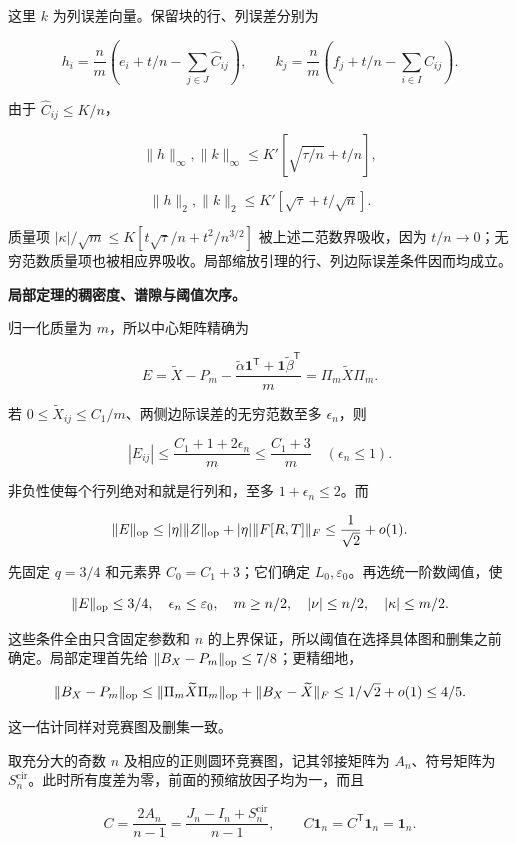 \documentclass[11pt,a4paper]{article}
\begin{document}
这里 \(k\) 为列误差向量。保留块的行、列误差分别为

\[
h_i=\frac nm\left(e_i+t/n-\sum_{j\in J}\widehat C_{ij}\right),\qquad
k_j=\frac nm\left(f_j+t/n-\sum_{i\in I}\widehat C_{ij}\right).
\]

由于 \(\widehat C_{ij}\le K/n\)，

\[
\|h\|_\infty,\|k\|_\infty\le K'[\sqrt{\tau/n}+t/n],
\]

\[
\|h\|_2,\|k\|_2\le K'[\sqrt\tau+t/\sqrt n].
\]

质量项 \(|\kappa|/\sqrt m\le K[t\sqrt\tau/n+t^2/n^{3/2}]\) 被上述二范数界吸收，因为 \(t/n\to0\)；无穷范数质量项也被相应界吸收。局部缩放引理的行、列边际误差条件因而均成立。

\textbf{局部定理的稠密度、谱隙与阈值次序。}

归一化质量为 \(m\)，所以中心矩阵精确为

\[
E=\widetilde X-P_m-\frac{\widetilde\alpha\mathbf1^{\mathsf T}
+\mathbf1\widetilde\beta^{\mathsf T}}m
=\Pi_m\widetilde X\Pi_m.
\]

若 \(0\le\widetilde X_{ij}\le C_1/m\)、两侧边际误差的无穷范数至多 \(\epsilon_n\)，则

\[
|E_{ij}|\le\frac{C_1+1+2\epsilon_n}{m}\le\frac{C_1+3}{m}
\quad(\epsilon_n\le1).
\]

非负性使每个行列绝对和就是行列和，至多 \(1+\epsilon_n\le2\)。而

\[
\|E\|_{\rm op}\le|\eta|\|Z\|_{\rm op}+|\eta|\|F[R,T]\|_F
\le\frac1{\sqrt2}+o(1).
\]

先固定 \(q=3/4\) 和元素界 \(C_0=C_1+3\)；它们确定 \(L_0,\varepsilon_0\)。再选统一阶数阈值，使

\[
\|E\|_{\rm op}\le3/4,\quad
\epsilon_n\le\varepsilon_0,\quad m\ge n/2,
\quad |\nu|\le n/2,\quad |\kappa|\le m/2.
\]

这些条件全由只含固定参数和 \(n\) 的上界保证，所以阈值在选择具体图和删集之前确定。局部定理首先给 \(\|B_X-P_m\|_{\rm op}\le7/8\)；更精细地，

\[
\|B_X-P_m\|_{\rm op}
\le\|\Pi_m\widetilde X\Pi_m\|_{\rm op}
+\|B_X-\widetilde X\|_F
\le1/\sqrt2+o(1)\le4/5.
\]

这一估计同样对竞赛图及删集一致。

取充分大的奇数 \(n\) 及相应的正则圆环竞赛图，记其邻接矩阵为 \(A_n\)、符号矩阵为 \(S_n^{\mathrm{cir}}\)。此时所有度差为零，前面的预缩放因子均为一，而且

\[
C=\frac{2A_n}{n-1}=\frac{J_n-I_n+S_n^{\mathrm{cir}}}{n-1},
\qquad C\mathbf1_n=C^{\mathsf T}\mathbf1_n=\mathbf1_n.
\]
\end{document}
